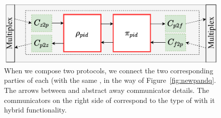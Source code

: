 \begin{figure}
\centering
\includegraphics[scale=0.5]{figures/newcompose.pdf}
\caption{When we compose two protocols, we connect the two corresponding parties of each (with the same , in the way of Figure~\ref{fig:newpandq}. The arrows between \RHO and \PI abstract away communicator details. The communicators on the right side of \PI correspond to the type of \PI with it hybrid functionality.}
\label{fig:replacement}
\end{figure}


